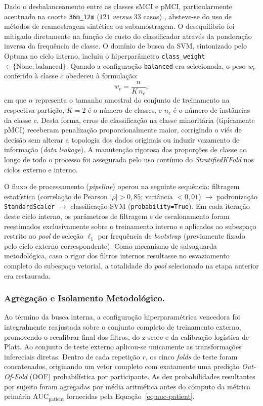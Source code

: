 \documentclass[review]{elsarticle}
\newcommand{\code}[1]{\texttt{#1}}
\begin{document}
	Dado o desbalanceamento entre as classes sMCI e pMCI, particularmente acentuado na coorte \code{36m\_12m} ($121$ \emph{versus} $33$ casos) , absteve-se do uso de métodos de reamostragem sintética ou subamostragem. O desequilíbrio foi mitigado diretamente na função de custo do classificador através da ponderação inversa da frequência de classe. O domínio de busca da SVM, sintonizado pelo Optuna no ciclo interno, incluiu o hiperparâmetro \code{class\_weight} $\in \{\mathrm{None}, \mathrm{balanced}\}$. Quando a configuração \code{balanced} era selecionada, o peso $w_c$ conferido à classe $c$ obedeceu à formulação:
	\begin{equation}
		w_c = \frac{n}{K\,n_c},
		\label{eq:class-weight}
	\end{equation}
	em que $n$ representa o tamanho amostral do conjunto de treinamento na respectiva partição, $K=2$ é o número de classes, e $n_c$ é o número de instâncias da classe $c$. Desta forma, erros de classificação na classe minoritária (tipicamente pMCI) receberam penalização proporcionalmente maior, corrigindo o viés de decisão sem alterar a topologia dos dados originais ou induzir vazamento de informação (\emph{data leakage}). A manutenção rigorosa das proporções de classe ao longo de todo o processo foi assegurada pelo uso contínuo do \emph{StratifiedKFold} nos ciclos externo e interno.
	
	O fluxo de processamento (\emph{pipeline}) operou na seguinte sequência: filtragem estatística (correlação de Pearson $|\rho|>0{,}85$; variância $<0{,}01$) $\to$ padronização \code{StandardScaler} $\to$ classificação SVM (\code{probability=True}). Em cada iteração deste ciclo interno, os parâmetros de filtragem e de escalonamento foram reestimados exclusivamente sobre o treinamento interno e aplicados ao subespaço restrito ao \emph{pool} de seleção $\ell_1$ por frequência de \emph{bootstrap} (previamente fixado pelo ciclo externo correspondente). Como mecanismo de salvaguarda metodológica, caso o rigor dos filtros internos resultasse no esvaziamento completo do subespaço vetorial, a totalidade do \emph{pool} selecionado na etapa anterior era restaurada.
	
	\subsubsection{Agregação e Isolamento Metodológico.} 
	Ao término da busca interna, a configuração hiperparamétrica vencedora foi integralmente reajustada sobre o conjunto completo de treinamento externo, promovendo o recalibrar final dos filtros, do z-score e da calibração logística de Platt. Ao conjunto de teste externo aplicou-se unicamente as transformações infereciais diretas. Dentro de cada repetição $r$, os cinco \emph{folds} de teste foram concatenados, originando um vetor completo com exatamente uma predição \emph{Out-Of-Fold} (OOF) probabilística por participante. As dez probabilidades resultantes por sujeito foram agregadas por média aritmética antes do cômputo da métrica primária $\mathrm{AUC}_{\mathrm{patient}}$ fornecidas pela Equação~\ref{eq:auc-patient}. 
\end{document}
